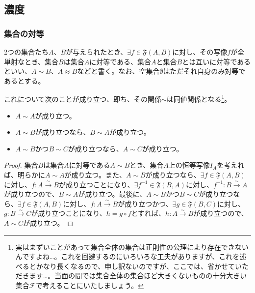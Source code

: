 \documentclass[dvipdfmx]{jsarticle}
\begin{document}
\subsection{濃度}%
\subsubsection{集合の対等}%
\begin{dfn}
2つの集合たち$A$、$B$が与えられたとき、$\exists f \in \mathfrak{F}(A,B)$に対し、その写像$f$が全単射なとき、集合$B$は集合$A$に対等である、集合$A$と集合$B$とは互いに対等であるといい、$A \sim B$、$A \approx B$などと書く。なお、空集合$\emptyset$はただそれ自身のみ対等であるとする。
\end{dfn}
\begin{thm}\label{1.2.7.1}
これについて次のことが成り立つ、即ち、その関係$\sim$は同値関係となる\footnote{実はまずいことがあって集合全体の集合は正則性の公理により存在できないんですよね…。これを回避するのにいろいろな工夫がありますが、これを述べるとかなり長くなるので、申し訳ないのですが、ここでは、省かせていただきます…。当面の間では集合全体の集合ほど大きくないものの十分大きい集合$\mathcal{F}$で考えることにいたしましょう。}。
\begin{itemize}
\item
  $A \sim A$が成り立つ。
\item
  $A \sim B$が成り立つなら、$B \sim A$が成り立つ。
\item
  $A \sim B$かつ$B \sim C$が成り立つなら、$A \sim C$が成り立つ。
\end{itemize}
\end{thm}
\begin{proof}
集合$B$は集合$A$に対等である$A \sim B$とき、集合$A$上の恒等写像$I_{A}$を考えれば、明らかに$A \sim A$が成り立つ。また、$A \sim B$が成り立つなら、$\exists f \in \mathfrak{F}(A,B)$に対し、$f:A\overset{\sim}{\rightarrow}B$が成り立つことになり、$\exists f^{- 1}\in \mathfrak{F}(B,A)$に対し、$f^{- 1}:B\overset{\sim}{\rightarrow}A$が成り立つので、$B \sim A$が成り立つ。最後に、$A \sim B$かつ$B \sim C$が成り立つなら、$\exists f \in \mathfrak{F}(A,B)$に対し、$f:A\overset{\sim}{\rightarrow}B$が成り立つかつ、$\exists g\in \mathfrak{F}(B,C)$に対し、$g:B\overset{\sim}{\rightarrow}C$が成り立つことになり、$h = g \circ f$とすれば、$h:A\overset{\sim}{\rightarrow}B$が成り立つので、$A \sim C$が成り立つ。
\end{proof}
\end{document}
